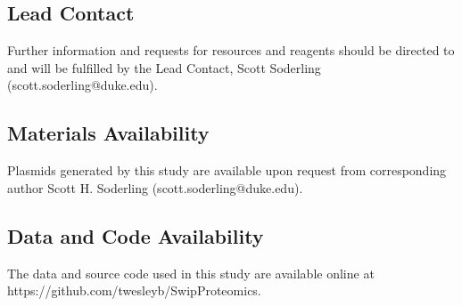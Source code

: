 \subsection{Lead Contact}
Further information and requests for resources and reagents should be directed
to and will be fulfilled by the Lead Contact, Scott Soderling
(scott.soderling@duke.edu).

\subsection{Materials Availability}
Plasmids generated by this study are available upon request from corresponding
author Scott H. Soderling (scott.soderling@duke.edu).

\subsection{Data and Code Availability}
The data and source code used in this study are available online at
https://github.com/twesleyb/SwipProteomics. 


